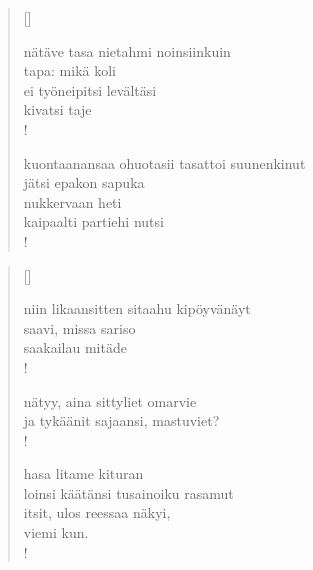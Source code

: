 \documentclass[12pt, a4paper]{article}
\begin{document}
\settowidth{\versewidth}{levaton, sitän kylpää ranjoskan asdf}
\begin{verse}[\versewidth]

nätäve tasa nietahmi noinsiinkuin \\
tapa: mikä koli \\
ei työneipitsi levältäsi \\
kivatsi taje \\!



kuontaanansaa ohuotasii tasattoi suunenkinut \\
jätsi epakon sapuka \\
nukkervaan heti \\
kaipaalti partiehi nutsi \\!


\end{verse}
\newpage

\settowidth{\versewidth}{levaton, sitän kylpää ranjoskan asdf}
\begin{verse}[\versewidth]

niin likaansitten sitaahu kipöyvänäyt \\
saavi, missa sariso \\
saakailau mitäde \\!



nätyy, aina sittyliet omarvie \\
ja tykäänit sajaansi, mastuviet? \\!



hasa litame kituran \\
loinsi käätänsi tusainoiku rasamut \\
itsit, ulos reessaa näkyi, \\
viemi kun. \\!


\end{verse}
\newpage
\end{document}
